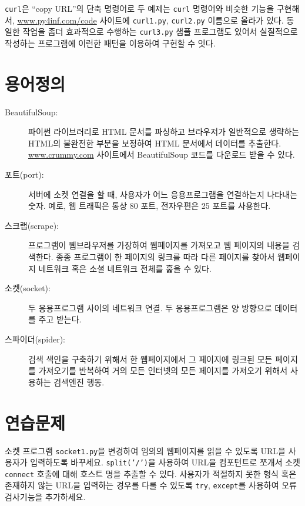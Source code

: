 {\tt curl}은 ``copy URL''의 단축 명령어로 두 예제는 {\tt curl} 명령어와 비슷한 기능을 구현해서, 
\url{www.py4inf.com/code} 사이트에 {\tt curl1.py}, {\tt curl2.py} 이름으로 올라가 있다.
동일한 작업을 좀더 효과적으로 수행하는 {\tt curl3.py} 샘플 프로그램도 있어서 실질적으로 작성하는 프로그램에 이런한 패턴을 이용하여 구현할 수 잇다.

\section{용어정의}

\begin{description}

\item[BeautifulSoup:] 파이썬 라이브러리로 HTML 문서를 파싱하고 
브라우저가 일반적으로 생략하는 HTML의 불완전한 부분을 보정하여 HTML 문서에서 데이터를 추출한다.
\url{www.crummy.com} 사이트에서 BeautifulSoup 코드를 다운로드 받을 수 있다.


\item[포트(port):] 서버에 소켓 연결을 할 때, 사용자가 어느 응용프로그램을 연결하는지 나타내는 숫자.
예로, 웹 트래픽은 통상 80 포트, 전자우편은 25 포트를 사용한다.


\item[스크랩(scrape):] 프로그램이 웹브라우저를 가장하여 웹페이지를 가져오고 웹 페이지의 내용을 검색한다.
종종 프로그램이 한 페이지의 링크를 따라 다른 페이지를 찾아서 웹페이지 네트워크 혹은 소셜 네트워크 전체를 훑을 수 있다.


\item[소켓(socket):] 두 응용프로그램 사이의 네트워크 연결. 두 응용프로그램은 양 방향으로 데이터를 주고 받는다.

\item[스파이더(spider):] 검색 색인을 구축하기 위해서 한 웹페이지에서 그 페이지에 링크된 모든 페이지를 가져오기를 반복하여
거의 모든 인터넷의 모든 페이지를 가져오기 위해서 사용하는 검색엔진 행동.

\end{description}

\section{연습문제}

\begin{ex}
소켓 프로그램 {\tt socket1.py}을 변경하여 임의의 웹페이지를 읽을 수 있도록 URL을 사용자가 입력하도록 바꾸세요.
{\tt split('/')}을 사용하여 URL을 컴포턴트로 쪼개서 소켓 {\tt connect} 호출에 대해 호스트 명을 추출할 수 있다.
사용자가 적절하지 못한 형식 혹은 존재하지 않는 URL을 입력하는 경우를 다룰 수 있도록 {\tt try}, {\tt except}를 사용하여 오류 검사기능을 추가하세요.
\end{ex}

